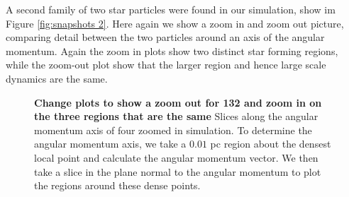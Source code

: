 \documentclass{emulateapj}
\begin{document}
A second family of two star particles were found in our simulation, show im Figure \ref{fig:snapshots 2}.  Here again we show a zoom in and zoom out picture, comparing detail between the two particles around an axis of the angular momentum.  Again the zoom in plots show two distinct star forming regions, while the zoom-out plot show that the larger region and hence large scale dynamics are the same.  

\begin{figure}
\caption{{\bf Change plots to show a zoom out for 132 and zoom in on the three regions that are the same} Slices along the angular momentum axis of four zoomed in simulation. To determine the angular momentum axis, we take a $0.01$ pc region about the densest local point and calculate the angular momentum vector. We then take a slice in the plane normal to the angular momentum to plot the regions around these dense points. \label{fig:snapshots}}
\end{figure}
\end{document}
